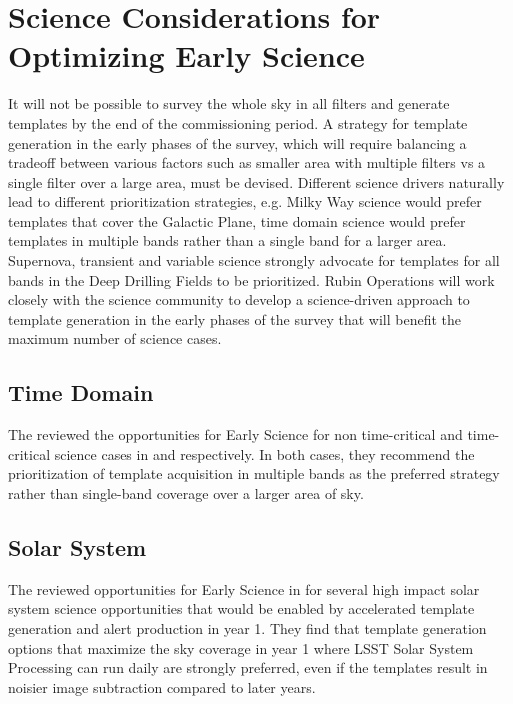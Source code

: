 \section{Science Considerations for Optimizing Early Science} \label{sec:science}

It will not be possible to survey the whole sky in all filters and generate templates by the end of the commissioning period. 
A strategy for template generation in the early phases of the survey, which will require balancing a tradeoff between various factors such as smaller area with multiple filters vs a single filter over a large area, must be devised. 
Different science drivers naturally lead to different prioritization strategies, e.g. Milky Way science would prefer templates that cover the Galactic Plane, time domain science would prefer templates in multiple bands rather than a single band for a larger area. 
Supernova, transient and variable science strongly advocate for templates for all bands in the Deep Drilling Fields to be prioritized. 
Rubin Operations will work closely with the science community to develop a science-driven approach to template generation in the early phases of the survey that will benefit the maximum number of science cases. 

\subsection{Time Domain}

The \tvssc reviewed the opportunities for Early Science  for non time-critical and time-critical science cases in \citep{Hambleton_2020} and \citep{Street_2020} respectively. 
In both cases, they recommend the prioritization of template acquisition in multiple bands as the preferred strategy rather than single-band  coverage over a larger area of sky. 

\subsection{Solar System}

The \sssc reviewed opportunities for Early Science  in \citep{2020arXiv201005926L} for several high impact solar system science opportunities that would be enabled by accelerated template generation and alert production in year 1. 
They find that template generation options that maximize the sky coverage in year 1 where LSST Solar System Processing can run daily are strongly preferred, even if the templates result in noisier image subtraction compared to later years.

